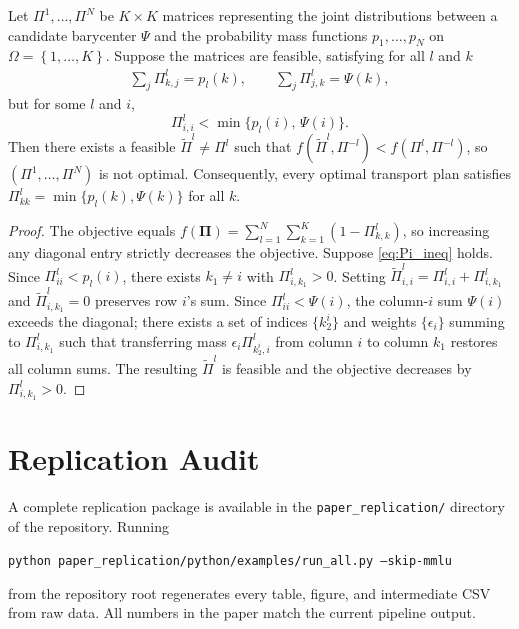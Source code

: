 \begin{proposition}
\label{prop:fulldiag}
Let $\Pi^{1},\ldots,\Pi^{N}$ be $K\times K$ matrices representing the joint distributions between a candidate barycenter $\Psi$ and the probability mass functions $p_1,\ldots,p_N$ on $\Omega=\left\{1,\ldots,K\right\}$.  Suppose the matrices are feasible, satisfying for all $l$ and $k$
\begin{align*}
\sum_{j}\Pi_{k,j}^{l}=p_l(k),\qquad
\sum_{j}\Pi_{j,k}^{l}=\Psi(k),
\end{align*}
but for some $l$ and $i$,
\begin{equation}
\label{eq:Pi_ineq}
\Pi^{l}_{i,i} < \min\bigl\{p_l(i),\,\Psi(i)\bigr\}.
\end{equation}
Then there exists a feasible $\tilde{\Pi}^{l}\neq \Pi^{l}$ such that
$f(\tilde{\Pi}^l,\Pi^{-l}) < f(\Pi^l,\Pi^{-l})$,
so $(\Pi^1,\ldots,\Pi^N)$ is not optimal.  Consequently, every optimal transport plan satisfies $\Pi^{l}_{kk}=\min\{p_l(k),\Psi(k)\}$ for all $k$.
\end{proposition}
\begin{proof}
The objective equals $f(\mathbf{\Pi})= \sum_{l=1}^N \sum_{k=1}^K (1 - \Pi_{k,k}^{l})$, so increasing any diagonal entry strictly decreases the objective.  Suppose \eqref{eq:Pi_ineq} holds.  Since $\Pi^l_{ii} < p_l(i)$, there exists $k_1\neq i$ with $\Pi^l_{i,k_1}>0$.  Setting $\tilde\Pi^l_{i,i}=\Pi^l_{i,i}+\Pi^l_{i,k_1}$ and $\tilde\Pi^l_{i,k_1}=0$ preserves row $i$'s sum.  Since $\Pi^l_{ii}<\Psi(i)$, the column-$i$ sum $\Psi(i)$ exceeds the diagonal; there exists a set of indices $\{k^i_2\}$ and weights $\{\epsilon_i\}$ summing to $\Pi^l_{i,k_1}$ such that transferring mass $\epsilon_i\Pi^l_{k^i_2,i}$ from column $i$ to column $k_1$ restores all column sums.  The resulting $\tilde\Pi^l$ is feasible and the objective decreases by $\Pi^l_{i,k_1}>0$.
\end{proof}

\section{Replication Audit}
\label{app:replication}

A complete replication package is available in the \texttt{paper\_replication/} directory of
the repository.  Running
\begin{center}
\texttt{python paper\_replication/python/examples/run\_all.py --skip-mmlu}
\end{center}
from the repository root regenerates every table, figure, and intermediate CSV from raw data.
All numbers in the paper match the current pipeline output.

